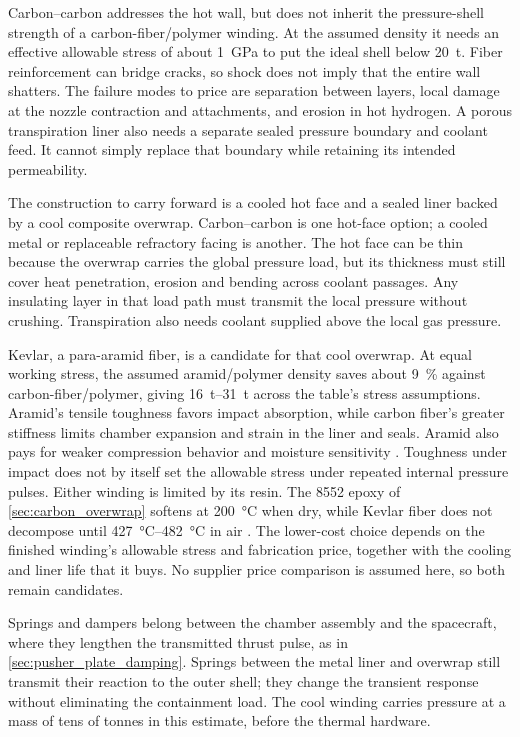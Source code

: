 \documentclass{article}
\begin{document}
Carbon--carbon addresses the hot wall, but does not inherit the pressure-shell strength of a carbon-fiber/polymer winding. At the assumed density it needs an effective allowable stress of about \SI{1}{\giga\pascal} to put the ideal shell below \SI{20}{\tonne}. Fiber reinforcement can bridge cracks, so shock does not imply that the entire wall shatters. The failure modes to price are separation between layers, local damage at the nozzle contraction and attachments, and erosion in hot hydrogen. A porous transpiration liner also needs a separate sealed pressure boundary and coolant feed. It cannot simply replace that boundary while retaining its intended permeability.

The construction to carry forward is a cooled hot face and a sealed liner backed by a cool composite overwrap. Carbon--carbon is one hot-face option; a cooled metal or replaceable refractory facing is another. The hot face can be thin because the overwrap carries the global pressure load, but its thickness must still cover heat penetration, erosion and bending across coolant passages. Any insulating layer in that load path must transmit the local pressure without crushing. Transpiration also needs coolant supplied above the local gas pressure.

Kevlar, a para-aramid fiber, is a candidate for that cool overwrap. At equal working stress, the assumed aramid/polymer density saves about \SI{9}{\percent} against carbon-fiber/polymer, giving \SIrange{16}{31}{\tonne} across the table's stress assumptions. Aramid's tensile toughness favors impact absorption, while carbon fiber's greater stiffness limits chamber expansion and strain in the liner and seals. Aramid also pays for weaker compression behavior and moisture sensitivity \cite{kevlar_technical_guide}. Toughness under impact does not by itself set the allowable stress under repeated internal pressure pulses. Either winding is limited by its resin. The 8552 epoxy of \autoref{sec:carbon_overwrap} softens at \SI{200}{\celsius} when dry, while Kevlar fiber does not decompose until \SIrange{427}{482}{\celsius} in air \cite{kevlar_technical_guide}. The lower-cost choice depends on the finished winding's allowable stress and fabrication price, together with the cooling and liner life that it buys. No supplier price comparison is assumed here, so both remain candidates.

Springs and dampers belong between the chamber assembly and the spacecraft, where they lengthen the transmitted thrust pulse, as in \autoref{sec:pusher_plate_damping}. Springs between the metal liner and overwrap still transmit their reaction to the outer shell; they change the transient response without eliminating the containment load. The cool winding carries pressure at a mass of tens of tonnes in this estimate, before the thermal hardware.
\end{document}
